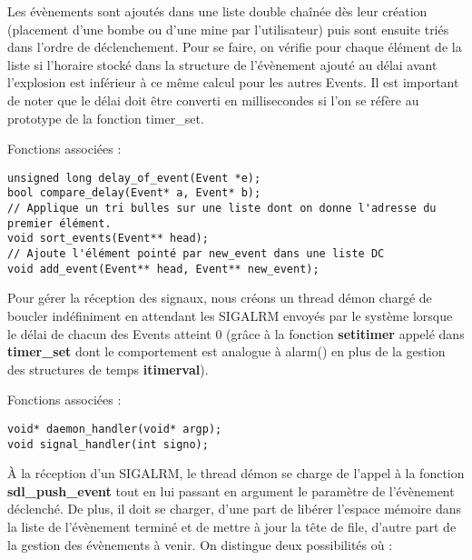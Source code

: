 \documentclass[a4paper]{article}
\begin{document}
Les évènements sont ajoutés dans une liste double chaînée dès leur création (placement d'une bombe ou d'une mine par l'utilisateur) puis sont ensuite triés dans l'ordre de déclenchement. Pour se faire, on vérifie pour chaque élément de la liste si l'horaire stocké dans la structure de l'évènement ajouté au délai avant l'explosion est inférieur à ce même calcul pour les autres Events. Il est important de noter que le délai doit être converti en millisecondes si l'on se réfère au prototype de la fonction timer\_set.

Fonctions associées :
\begin{verbatim}
unsigned long delay_of_event(Event *e);
bool compare_delay(Event* a, Event* b);
// Applique un tri bulles sur une liste dont on donne l'adresse du premier élément.
void sort_events(Event** head);
// Ajoute l'élément pointé par new_event dans une liste DC 
void add_event(Event** head, Event** new_event);
\end{verbatim}

Pour gérer la réception des signaux, nous créons un thread démon chargé de boucler indéfiniment en attendant les SIGALRM envoyés par le système lorsque le délai de chacun des Events atteint 0 (grâce à la fonction \textbf{setitimer} appelé dans \textbf{timer\_set} dont le comportement est analogue à alarm() en plus de la gestion des structures de temps \textbf{itimerval}).

Fonctions associées :
\begin{verbatim}
void* daemon_handler(void* argp);
void signal_handler(int signo);
\end{verbatim}

À la réception d'un SIGALRM, le thread démon se charge de l'appel à la fonction \textbf{sdl\_push\_event} tout en lui passant en argument le paramètre de l'évènement déclenché. De plus, il doit se charger, d'une part de libérer l'espace mémoire dans la liste de l'évènement terminé et de mettre à jour la tête de file, d'autre part de la gestion des évènements à venir. On distingue deux possibilités où : 
\end{document}
